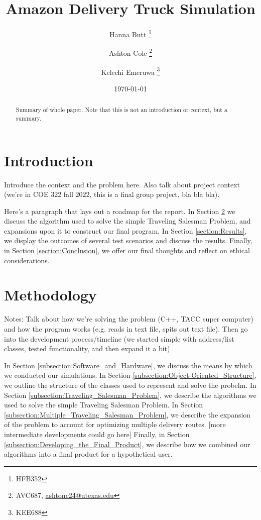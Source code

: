 \documentclass[letterpaper]{article}
\title{Amazon Delivery Truck Simulation}
\author{Hanna Butt \thanks{HFB352} \and Ashton Cole \thanks{AVC687, \href{mailto:ashtonc24@utexas.edu}{ashtonc24@utexas.edu}} \and Kelechi Emeruwa \thanks{KEE688}}
\date{\today}
\begin{document}
    \maketitle

    \begin{abstract}
        Summary of whole paper. Note that this is not an introduction or context, but a summary.
    \end{abstract}

    \section{Introduction}
    \label{section:Introduction}
    Introduce the context and the problem here. Also talk about project context (we're in COE 322 fall 2022, this is a final group project, bla bla bla).

    Here's a paragraph that lays out a roadmap for the report. In Section \ref{section:Methodology} we discuss the algorithm used to solve the simple Traveling Salesman Problem, and expansions upon it to construct our final program. In Section \ref{section:Results}, we display the outcomes of several test scenarios and discuss the results. Finally, in Section \ref{section:Conclusion}, we offer our final thoughts and reflect on ethical considerations.

    \section{Methodology}
    \label{section:Methodology}
    Notes: Talk about how we're solving the problem (C++, TACC super computer) and how the program works (e.g. reads in text file, spits out text file). Then go into the development process/timeline (we started simple with address/list classes, tested functionality, and then expand it a bit)

    In Section \ref{subsection:Software_and_Hardware}, we discuss the means by which we conducted our simulations. In Section \ref{subsection:Object-Oriented_Structure}, we outline the structure of the classes used to represent and solve the probelm. In Section \ref{subsection:Traveling_Salesman_Problem}, we describe the algorithms we used to solve the simple Traveling Salesman Problem. In Section \ref{subsection:Multiple_Traveling_Salesman_Problem}, we describe the expansion of the problem to account for optimizing multiple delivery routes. [more intermediate developments could go here] Finally, in Section \ref{subsection:Developing_the_Final_Product}, we describe how we combined our algorithms into a final product for a hypothetical user.
\end{document}
